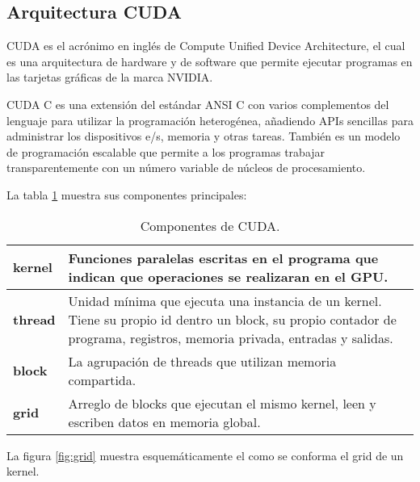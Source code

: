     \subsection{Arquitectura CUDA}
    CUDA es el acrónimo en inglés de Compute Unified Device Architecture, el cual es una arquitectura de hardware y de software que permite ejecutar programas en las tarjetas gráficas de la marca NVIDIA\cite{CUDAP}.
        
   \vspace{0.3cm}
   
    CUDA C es una extensión del estándar ANSI C con varios complementos del lenguaje para utilizar la programación heterogénea, añadiendo APIs sencillas para administrar los dispositivos e/s, memoria y otras tareas. También es un modelo de programación escalable que permite a los programas trabajar transparentemente con un número variable de núcleos de procesamiento.
        
   \vspace{0.3cm}
   
    La tabla \ref{tab:CUDAcomp} muestra sus componentes principales: 
    
     \begin{table}[h!]
      \begin{center}
            \footnotesize
        \begin{tabular}{|m{1.5cm}|m{8.5cm}|}
         \hline
         \cellcolor{lightgray}\textbf{kernel} & Funciones paralelas escritas en el programa que indican que operaciones se realizaran en el GPU.\\ 
         \hline
          \cellcolor{lightgray}\textbf{thread} & Unidad mínima que ejecuta una instancia de un kernel. Tiene su propio id dentro un block, su propio contador de programa, registros, memoria privada, entradas y salidas.\\ 
         \hline  
         \cellcolor{lightgray}\textbf{block} & La agrupación de threads que utilizan memoria compartida.\\ 
         \hline
         \cellcolor{lightgray}\textbf{grid} & Arreglo de blocks que ejecutan el mismo kernel, leen y escriben datos en memoria global.\\ 
         \hline
           \end{tabular}
        \caption{Componentes de CUDA.}
        \label{tab:CUDAcomp}
      \end{center}
    \end{table}
    
    La figura \ref{fig:grid} muestra esquemáticamente el como se conforma el grid de un kernel.
    
